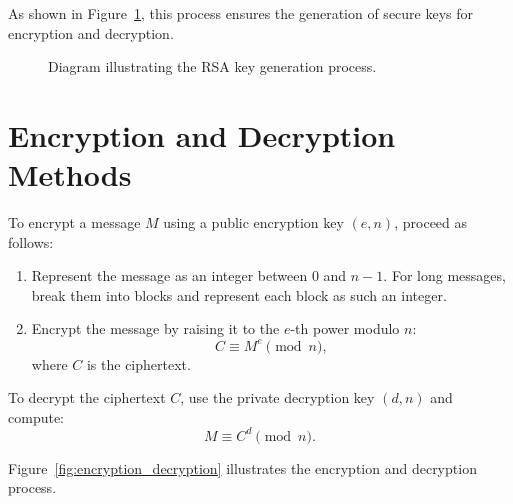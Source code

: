 \documentclass[12pt,a4paper]{report}
\begin{document}
As shown in Figure~\ref{fig:key_generation}, this process ensures the generation of secure keys for encryption and decryption.

\begin{figure}[ht!]
    \centering
    \caption{Diagram illustrating the RSA key generation process.}%
    \label{fig:key_generation}
\end{figure}

\section{Encryption and Decryption Methods}
To encrypt a message \( M \) using a public encryption key \((e, n)\), proceed as follows:
\begin{enumerate}
    \item Represent the message as an integer between \( 0 \) and \( n-1 \). For long messages, break them into blocks and represent each block as such an integer.
    \item Encrypt the message by raising it to the \( e \)-th power modulo \( n \):
    \[
    C \equiv M^e \pmod{n},
    \]
    where \( C \) is the ciphertext.
\end{enumerate}

To decrypt the ciphertext \( C \), use the private decryption key \((d, n)\) and compute:
\[
M \equiv C^d \pmod{n}.
\]

Figure~\ref{fig:encryption_decryption} illustrates the encryption and decryption process.
\end{document}

